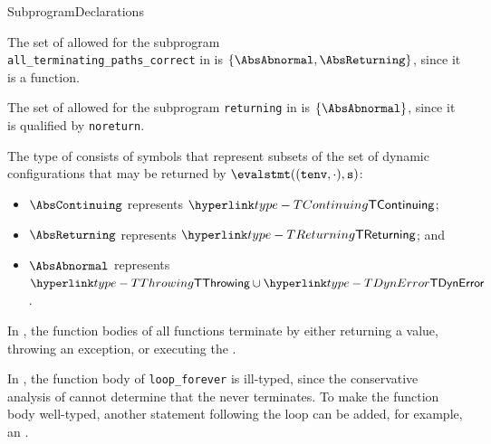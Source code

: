 \begin{TypingRuleList}{SubprogramDeclarations}


The set of \Proseabstractconfigurations{} allowed for the subprogram \\
\verb|all_terminating_paths_correct|
in  is $\{\AbsAbnormal, \AbsReturning\}$, since it is
a function.

The set of \Proseabstractconfigurations{} allowed for the subprogram \verb|returning|
in  is $\{\AbsAbnormal\}$, since it is qualified
by \verb|noreturn|.




The type 
of \emph{\Proseabstractconfigurations{}} consists of symbols that represent
subsets of the set of dynamic configurations that may be returned by
$\evalstmt((\tenv, \cdot), \vs)$:
\begin{itemize}
  \item $\AbsContinuing$ represents $\TContinuing$;
  \item $\AbsReturning$ represents $\TReturning$; and
  \item $\AbsAbnormal$ represents $\TThrowing \cup \TDynError$.
\end{itemize}

In , the function bodies of all functions
terminate by either returning a value, throwing an exception, or executing
the \unreachablestatementterm.

In , the function body of \verb|loop_forever|
is ill-typed, since the conservative analysis of 
cannot determine that the \whilestatementterm{} never terminates.
To make the function body well-typed, another statement following the loop
can be added, for example, an \unreachablestatementterm.


\end{TypingRuleList}
